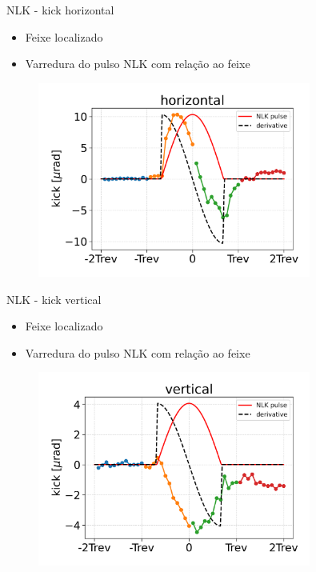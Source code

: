 \documentclass{beamer}					  %
\begin{document}
\begin{frame}{NLK - kick horizontal}
    \scriptsize{\begin{itemize}
    		\item Feixe localizado
            \item Varredura do pulso NLK com relação ao feixe
    \end{itemize}}
    \begin{figure}[H]
        	\centering
            \includegraphics[width=0.8\textwidth]{2024-01-26/figures/nlk_horizontal_kick_profile.png}
            \label{fig:nlk-h-kick-profile}
    \end{figure} 
\end{frame}

\begin{frame}{NLK - kick vertical}
    \scriptsize{\begin{itemize}
    		\item Feixe localizado
            \item Varredura do pulso NLK com relação ao feixe
    \end{itemize}}
    \begin{figure}[H]
        	\centering
            \includegraphics[width=0.8\textwidth]{2024-01-26/figures/nlk_vertical_kick_profile.png}
            \label{fig:nlk-v-kick-profile}
    \end{figure} 
\end{frame}
\end{document}
